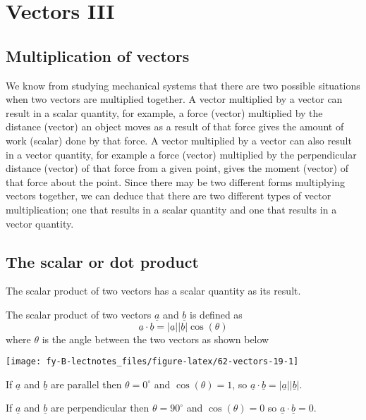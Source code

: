 \documentclass[
  11pt,
  oneside]{book}
\newcommand{\slide}{}
\theoremstyle{definition}
\theoremstyle{definition}
\theoremstyle{definition}
\theoremstyle{definition}
\theoremstyle{remark}
\begin{document}
\slide

\section{Vectors III}\label{vectors-iii}

\subsection{Multiplication of vectors}\label{multiplication-of-vectors}

We know from studying mechanical systems that there are two possible situations when two vectors are multiplied together. A vector multiplied by a vector can result in a scalar quantity, for example, a force (vector) multiplied by the distance (vector) an object moves as a result of that force gives the amount of work (scalar) done by that force. A vector multiplied by a vector can also result in a vector quantity, for example a force (vector) multiplied by the perpendicular distance (vector) of that force from a given point, gives the moment (vector) of that force about the point. Since there may be two different forms multiplying vectors together, we can deduce that there are two different types of vector multiplication; one that results in a scalar quantity and one that results in a vector quantity.

\slide

\subsection{The scalar or dot product}\label{the-scalar-or-dot-product}

The scalar product of two vectors has a scalar quantity as its result.

The scalar product of two vectors \(\underline a\) and \(\underline b\) is defined as
\[
\underline a \cdot\underline b = |\underline a||\underline b|\cos(\theta)
\]
where \(\theta\) is the angle between the two vectors as shown below

\begin{center}\texttt{[image: fy-B-lectnotes\_files/figure-latex/62-vectors-19-1]} \end{center}

If \(\underline a\) and \(\underline b\) are parallel then \(\theta = 0^\circ\) and \(\cos(\theta) = 1\), so \(\underline a \cdot\underline b = |\underline a||\underline b|\).

If \(\underline a\) and \(\underline b\) are perpendicular then \(\theta = 90^\circ\) and \(\cos(\theta) = 0\) so \(\underline a \cdot\underline b = 0\).
\end{document}
